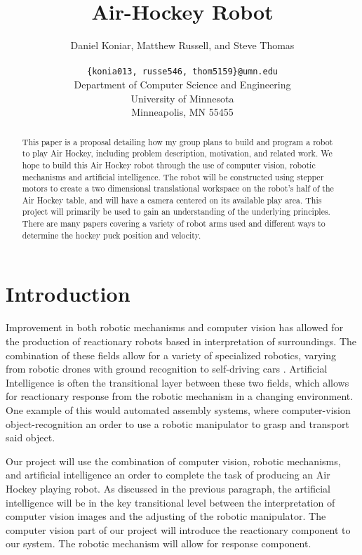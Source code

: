 \documentclass[letterpaper, 10 pt, conference]{ieeeconf}
\title{\bf
Air-Hockey Robot
}
\author{\parbox{5 in}{\centering Daniel Koniar, Matthew Russell, and Steve Thomas}\\
  {\tt\small \{konia013, russe546, thom5159\}@umn.edu}\\
  Department of Computer Science and Engineering\\
  University of Minnesota\\
  Minneapolis, MN 55455\\
}
\begin{document}
\maketitle
\thispagestyle{empty}
\pagestyle{empty}

\begin{abstract}
This paper is a proposal detailing how my group plans to build and program a robot to play Air Hockey, including problem description, motivation, and related work. We hope to build this Air Hockey robot through the use of computer vision, robotic mechanisms and artificial intelligence. The robot will be constructed using stepper motors to create a two dimensional translational workspace on the robot’s half of the Air Hockey table, and will have a camera centered on its available play area. This project will primarily be used to gain an understanding of the underlying principles. There are many papers covering a variety of robot arms used and different ways to determine the hockey puck position and velocity.
\end{abstract}

\section{Introduction}
Improvement in both robotic mechanisms and computer vision has allowed for the production of reactionary robots based in interpretation of surroundings.  The combination of these fields allow for a variety of specialized robotics, varying from robotic drones \cite{3dr} with ground recognition to self-driving cars \cite{googlecar}.  Artificial Intelligence is often the transitional layer between these two fields, which allows for reactionary response from the robotic mechanism in a changing environment.  One example of this would automated assembly systems, where computer-vision object-recognition an order to use a robotic manipulator to grasp and transport said object.

Our project will use the combination of computer vision, robotic mechanisms, and artificial intelligence an order to complete the task of producing an Air Hockey playing robot.  As discussed in the previous paragraph, the artificial intelligence will be in the key transitional level between the interpretation of computer vision images and the adjusting of the robotic manipulator.  The computer vision part of our project will introduce the reactionary component to our system.  The robotic mechanism will allow for response component.
\end{document}
